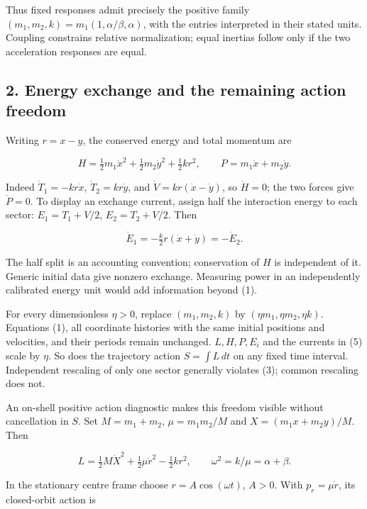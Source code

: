 \documentclass[11pt,a4paper]{article}
\begin{document}
Thus fixed responses admit precisely the positive family
\((m_1,m_2,k)=m_1(1,\alpha/\beta,\alpha)\), with the entries interpreted
in their stated units. Coupling constrains relative normalization; equal
inertias follow only if the two acceleration responses are equal.

\hypertarget{energy-exchange-and-the-remaining-action-freedom}{%
\subsection{2. Energy exchange and the remaining action
freedom}\label{energy-exchange-and-the-remaining-action-freedom}}

Writing \(r=x-y\), the conserved energy and total momentum are

\[H=\tfrac12m_1\dot x^2+\tfrac12m_2\dot y^2+\tfrac12kr^2,
\qquad P=m_1\dot x+m_2\dot y. \tag{4}\]

Indeed \(\dot T_1=-kr\dot x\), \(\dot T_2=kr\dot y\), and
\(\dot V=kr(\dot x-\dot y)\), so \(\dot H=0\); the two forces give
\(\dot P=0\). To display an exchange current, assign half the
interaction energy to each sector: \(E_1=T_1+V/2\), \(E_2=T_2+V/2\).
Then

\[\dot E_1=-\tfrac{k}{2}r(\dot x+\dot y)=-\dot E_2. \tag{5}\]

The half split is an accounting convention; conservation of \(H\) is
independent of it. Generic initial data give nonzero exchange. Measuring
power in an independently calibrated energy unit would add information
beyond (1).

For every dimensionless \(\eta>0\), replace \((m_1,m_2,k)\) by
\((\eta m_1,\eta m_2,\eta k)\). Equations (1), all coordinate histories
with the same initial positions and velocities, and their periods remain
unchanged. \(L,H,P,E_i\) and the currents in (5) scale by \(\eta\). So
does the trajectory action \(S=\int L\,dt\) on any fixed time interval.
Independent rescaling of only one sector generally violates (3); common
rescaling does not.

An on-shell positive action diagnostic makes this freedom visible
without cancellation in \(S\). Set \(M=m_1+m_2\), \(\mu=m_1m_2/M\) and
\(X=(m_1x+m_2y)/M\). Then

\[L=\tfrac12M\dot X^2+\tfrac12\mu\dot r^2-\tfrac12kr^2,
\qquad \omega^2=k/\mu=\alpha+\beta. \tag{6}\]

In the stationary centre frame choose \(r=A\cos(\omega t)\), \(A>0\).
With \(p_r=\mu\dot r\), its closed-orbit action is
\end{document}
